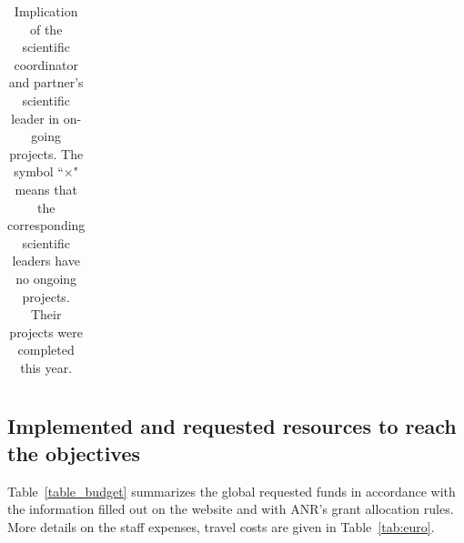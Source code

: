 \documentclass[a4paper,11pt]{article}
\begin{document}
{\begin{table}[h!]
\begin{tabular}{|l|c|c|c|c|c|c|}
 \hline%
\end{tabular}
\vspace*{-0.3cm}
\caption{Implication of the scientific coordinator and partner's scientific leader in on-going projects. The symbol ``$\times$" means that the corresponding scientific leaders have no ongoing projects. Their projects were completed this year.}\label{tab_ongoing}
\end{table}

}



















\vspace{-0.7cm}


\subsection[Implemented and requested resources to reach the objectives]{Implemented and requested resources to reach the objectives}

Table~\ref{table_budget} summarizes the global requested funds in accordance with the information filled out on the website and with ANR's grant allocation rules. More details on the staff expenses, travel costs are given in Table~\ref{tab:euro}.

\end{document}
